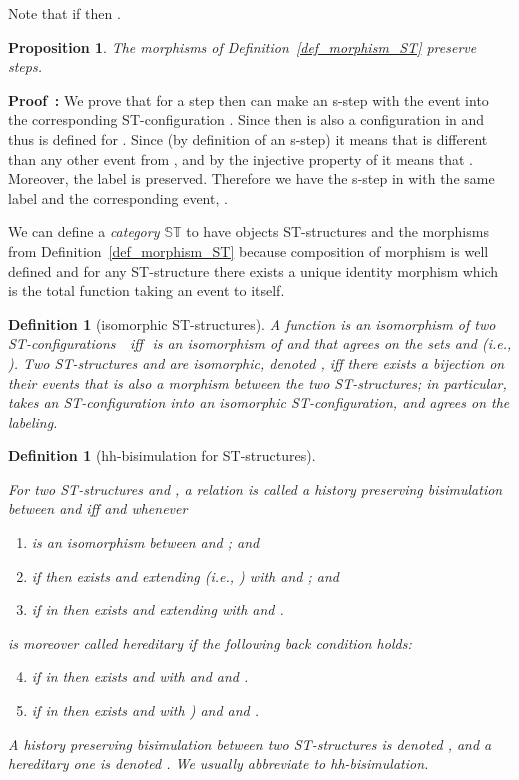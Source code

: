 \documentclass[submission,copyright,creativecommons]{eptcs}
\newtheorem{proposition}[theorem]{Proposition}
\newtheorem{definition}[theorem]{Definition}
\newenvironment{proof}[1][\!\!\,]{\vspace{1ex}\noindent\textbf{Proof #1: }}{\hfill\vspace{2ex}}
\newcommand\allST{\ensuremath{\mathbb{ST}}}
\newcommand\categoryST{\ensuremath{\allST}}
\begin{document}
Note that if  then .

\begin{proposition}
The morphisms of Definition~\ref{def_morphism_ST} preserve steps.
\end{proposition}

\begin{proof}
We prove that for a step  then  can make an s-step with the event  into the corresponding ST-configuration . Since  then  is also a configuration in  and thus  is defined for . Since  (by definition of an s-step) it means that  is different than any other event  from , and by the injective property of  it means that . Moreover, the label is preserved. Therefore we have the s-step in  with the same label and the corresponding event, .
\end{proof}

We can define a \textit{category \categoryST} to have objects ST-structures and the morphisms from Definition~\ref{def_morphism_ST} because composition of morphism is well defined and for any ST-structure there exists a unique identity morphism which is the total function taking an event to itself.

\begin{definition}[isomorphic ST-structures]\label{def_isomorphism}
A function  is an \emph{isomorphism} of two ST-configurations \,\ iff\,\  is an isomorphism of  and  that agrees on the sets  and  (i.e., ).
Two ST-structures  and  are isomorphic, denoted , iff there exists a bijection  on their events that is also a morphism between the two ST-structures; in particular,  takes an ST-configuration into an isomorphic ST-configuration, and agrees on the labeling.
\end{definition}


\begin{definition}[hh-bisimulation for ST-structures]\label{def_hh_ST}\ 

For two ST-structures  and , a relation  is called a history preserving bisimulation between  and  iff  and whenever 

\begin{enumerate}
\item  is an isomorphism between  and ; and
\item if  then exists  and  extending  (i.e., ) with  and  ; and
\item if  in  then exists  and  extending  with  and .
\end{enumerate}
 is moreover called \emph{hereditary} if the following back condition holds:
\begin{enumerate}
\setcounter{enumi}{3}
\item if  in  then exists  and  with  and  and  .
\item if  in  then exists  and  with ) and  and  .
\end{enumerate}
A history preserving bisimulation between two ST-structures is denoted , and a hereditary one is denoted . We usually abbreviate to hh-bisimulation.
\end{definition}
\end{document}
